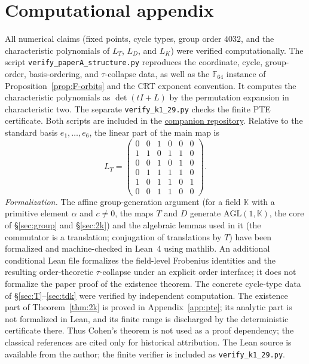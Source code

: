 \documentclass[11pt]{article}
\begin{document}
\appendix
\section{Computational appendix}\label{app:code}
All numerical claims (fixed points, cycle types, group order $4032$, and the
characteristic polynomials of $L_T$, $L_D$, and $L_K$) were verified
computationally. The script \texttt{verify\_paperA\_structure.py} reproduces
the coordinate, cycle, group-order, basis-ordering, and $\tau$-collapse data,
as well as the $\mathbb F_{64}$ instance of Proposition~\ref{prop:F-orbits}
and the CRT exponent convention. It computes the characteristic polynomials
as $\det(tI+L)$ by the permutation expansion in characteristic two.
The separate \texttt{verify\_k1\_29.py} checks the finite PTE certificate.
Both scripts are included in the
\href{https://github.com/63331849121/yijing-mathematical-structures}{companion repository}. Relative to the standard basis $e_1,\dots,e_6$, the linear part of
the main map is
\[
L_T=\begin{pmatrix}
0&0&1&0&0&0\\
1&1&0&1&1&0\\
0&0&1&0&1&0\\
0&1&1&1&1&0\\
1&0&1&1&0&1\\
0&0&1&1&0&0
\end{pmatrix}.
\]
\emph{Formalization.} The affine group-generation argument (for a field $\mathbb K$ with a primitive
element $\alpha$ and $c\ne0$, the maps $T$ and $D$ generate $\mathrm{AGL}(1,\mathbb K)$, the core
of \S\ref{sec:group} and \S\ref{sec:2k}) and the algebraic lemmas used in it (the commutator
is a translation; conjugation of translations by $T$) have been formalized and
machine-checked in Lean~4 using mathlib. An additional conditional Lean file
formalizes the field-level Frobenius identities and the resulting
order-theoretic $\tau$-collapse under an explicit order interface; it does not
formalize the paper proof of the existence theorem. The concrete cycle-type data of
\S\ref{sec:T}--\ref{sec:tdk} were verified by independent computation. The existence
part of Theorem~\ref{thm:2k} is proved in Appendix~\ref{app:pte}; its analytic part
is not formalized in Lean, and its finite range is discharged by the deterministic
certificate there. Thus Cohen's theorem is not used as a proof dependency; the
classical references are cited only for historical attribution. The Lean source is
available from the author; the finite verifier is included as
\texttt{verify\_k1\_29.py}.
\end{document}
